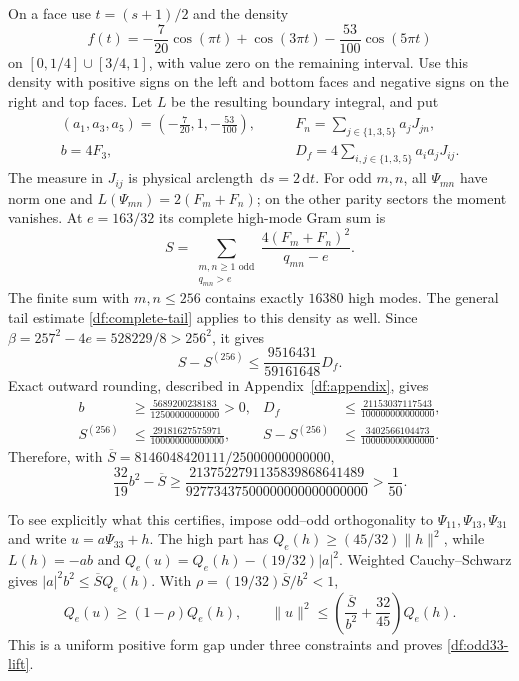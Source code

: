 \documentclass[11pt,reqno]{amsart}
\numberwithin{equation}{section}
\newcommand{\dd}{\,\mathrm d}
\newcommand{\abs}[1]{\lvert#1\rvert}
\newcommand{\norm}[1]{\lVert#1\rVert}
\begin{document}
On a face use $t=(s+1)/2$ and the density
\[
 f(t)=-\frac7{20}\cos(\pi t)+\cos(3\pi t)
       -\frac{53}{100}\cos(5\pi t)
\]
on $[0,1/4]\cup[3/4,1]$, with value zero on the remaining interval.
Use this density with positive signs on the left and bottom faces
and negative signs on the right and top faces. Let $L$ be the
resulting boundary integral, and put
\begin{align*}
 (a_1,a_3,a_5)=\left(-\frac7{20},1,-\frac{53}{100}\right),
 &\qquad F_n=\sum_{j\in\{1,3,5\}}a_jJ_{jn},\\
 b=4F_3,
 &\qquad D_f=4\sum_{i,j\in\{1,3,5\}}a_ia_jJ_{ij}.
\end{align*}
The measure in $J_{ij}$ is physical arclength $\dd s=2\dd t$.
For odd $m,n$, all $\Psi_{mn}$ have norm one and
$L(\Psi_{mn})=2(F_m+F_n)$; on the other parity sectors the moment
vanishes. At $e=163/32$ its complete high-mode Gram sum is
\[
 S=\sum_{\substack{m,n\ge1\text{ odd}\\q_{mn}>e}}
       \frac{4(F_m+F_n)^2}{q_{mn}-e}.
\]
The finite sum with $m,n\le256$ contains exactly $16380$ high modes.
The general tail estimate \eqref{df:complete-tail} applies to this
density as well. Since
$\beta=257^2-4e=528229/8>256^2$, it gives
\[
 S-S^{(256)}\le\frac{9516431}{59161648}D_f.
\]
Exact outward rounding, described in Appendix~\ref{df:appendix},
gives
\begin{align*}
 b&\ge\frac{5689200238183}{12500000000000}>0,
 &D_f&\le\frac{21153037117543}{100000000000000},\\
 S^{(256)}&\le\frac{29181627575971}{100000000000000},
 &S-S^{(256)}&\le\frac{3402566104473}{100000000000000}.
\end{align*}
Therefore, with
$\overline S=8146048420111/25000000000000$,
\begin{equation}
 \frac{32}{19}b^2-\overline S
 \ge\frac{2137522791135839868641489}
            {92773437500000000000000000}
 >\frac1{50}.
 \label{df:odd33-margin}
\end{equation}

To see explicitly what this certifies, impose odd--odd orthogonality
to $\Psi_{11},\Psi_{13},\Psi_{31}$ and write $u=a\Psi_{33}+h$.
The high part has $Q_e(h)\ge(45/32)\norm h^2$, while
$L(h)=-ab$ and
$Q_e(u)=Q_e(h)-(19/32)\abs a^2$. Weighted Cauchy--Schwarz gives
$\abs a^2b^2\le\overline S Q_e(h)$. With
$\rho=(19/32)\overline S/b^2<1$,
\[
 Q_e(u)\ge(1-\rho)Q_e(h),\qquad
 \norm u^2\le\left(\frac{\overline S}{b^2}+\frac{32}{45}\right)Q_e(h).
\]
This is a uniform positive form gap under three constraints and
proves \eqref{df:odd33-lift}.
\end{document}
